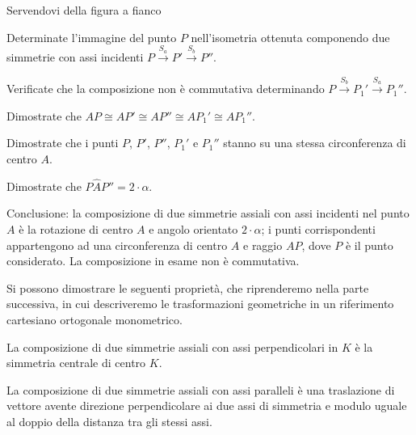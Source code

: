 \noindent\begin{minipage}{0.6\textwidth}\parindent15pt
\begin{esempio}
Servendovi della figura a fianco
\begin{itemize*}
\item Determinate l'immagine del punto $P$ nell'isometria ottenuta 
componendo due simmetrie con assi incidenti 
$P\overset{S_a}\rightarrow P' \overset{S_b}\rightarrow P''$.
\item Verificate che la composizione non è commutativa determinando 
$P\overset{S_b}\rightarrow P_1' \overset{S_a}\rightarrow P_1''$.
\item Dimostrate che $AP \cong AP'\cong AP''\cong AP_1' \cong AP_1''$.
\item Dimostrate che i punti $P$, $P'$, $P''$, $P_1'$ e $P_1''$ 
stanno su una stessa circonferenza di centro $A$.
\item Dimostrate che $P\widehat{A}P''=2\cdot \alpha$.
\end{itemize*}
\end{esempio}
\end{minipage}\hfil
\begin{minipage}{0.4\textwidth}
  \centering
\end{minipage}\vspace{5pt}
      
Conclusione: la composizione di due simmetrie assiali con assi 
incidenti nel punto $A$ è la rotazione di centro $A$ e angolo 
orientato $2\cdot \alpha$; i punti corrispondenti appartengono ad una 
circonferenza di centro $A$ e raggio $AP$, dove $P$ è il punto 
considerato. La composizione in esame non è commutativa.

Si possono dimostrare le seguenti proprietà, che riprenderemo nella parte 
successiva, in cui descriveremo le trasformazioni geometriche in un riferimento 
cartesiano ortogonale monometrico.

\begin{proposizione}
La composizione di due simmetrie assiali con assi 
perpendicolari in $K$ è la simmetria centrale di centro $K$. 
\end{proposizione}

\begin{proposizione}
La composizione di due simmetrie assiali con assi paralleli è una 
traslazione di vettore avente direzione perpendicolare ai due assi di 
simmetria e modulo uguale al doppio della distanza tra gli stessi 
assi.
\end{proposizione}
      
